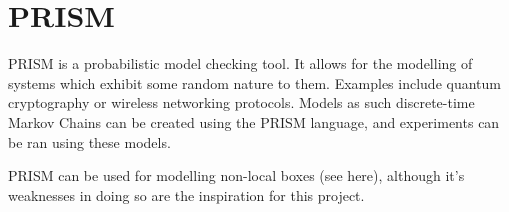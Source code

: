 \documentclass[report.tex]{subfiles}
\begin{document}

\section{PRISM} %
\label{sec:prism}
PRISM \cite{KNP11} is a probabilistic model checking tool. It allows for
the modelling of systems which exhibit some random nature to them. Examples
include quantum cryptography or wireless networking protocols. Models as such
discrete-time Markov Chains can be created using the PRISM language, and
experiments can be ran using these models.

PRISM can be used for modelling non-local boxes (see here), although it's
weaknesses in doing so are the inspiration for this project.

\newpage
\end{document}
